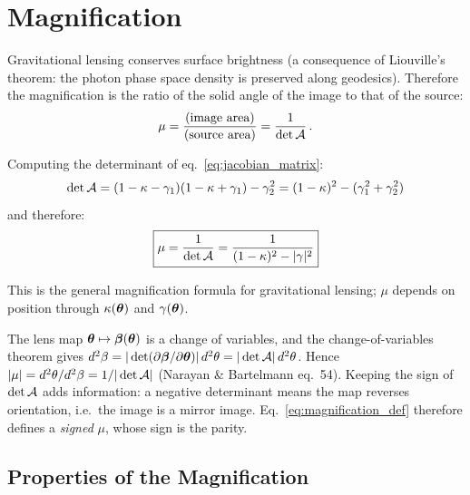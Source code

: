 \section{Magnification}
\label{sec:magnification}

Gravitational lensing conserves surface brightness (a consequence of
Liouville's theorem: the photon phase space density is preserved
along geodesics).  Therefore the magnification is the ratio of
the solid angle of the image to that of the source:
\begin{equation}
    \mu = \frac{\text{(image area)}}{\text{(source area)}}
    = \frac{1}{\det \mathcal{A}} \,.
    \label{eq:magnification_def}
\end{equation}

Computing the determinant of eq.~\eqref{eq:jacobian_matrix}:
\begin{equation}
    \det \mathcal{A} = (1 - \kappa - \gamma_1)(1 - \kappa + \gamma_1)
    - \gamma_2^2
    = (1 - \kappa)^2 - (\gamma_1^2 + \gamma_2^2)
\end{equation}
and therefore:
\begin{equation}
    \boxed{
    \mu = \frac{1}{\det \mathcal{A}}
    = \frac{1}{(1 - \kappa)^2 - |\gamma|^2}
    }
    \label{eq:magnification_formula}
\end{equation}

This is the general magnification formula for gravitational
lensing; $\mu$ depends on position through
$\kappa(\boldsymbol{\theta})$ and $\gamma(\boldsymbol{\theta})$.
\begin{derivation}
The lens map $\boldsymbol{\theta} \mapsto \boldsymbol{\beta}(\boldsymbol{\theta})$ is a change of variables,
and the change-of-variables theorem gives
$d^2\beta = |\det(\partial\boldsymbol{\beta}/\partial\boldsymbol{\theta})|\,d^2\theta = |\det\mathcal{A}|\,d^2\theta$.
Hence $|\mu| = d^2\theta/d^2\beta = 1/|\det\mathcal{A}|$ (Narayan \& Bartelmann
eq.~54). Keeping the sign of $\det\mathcal{A}$ adds information: a negative
determinant means the map reverses orientation, i.e.\ the image is a mirror
image. Eq.~\eqref{eq:magnification_def} therefore defines a \emph{signed} $\mu$, whose
sign is the parity.
\end{derivation}

\subsection{Properties of the Magnification}

